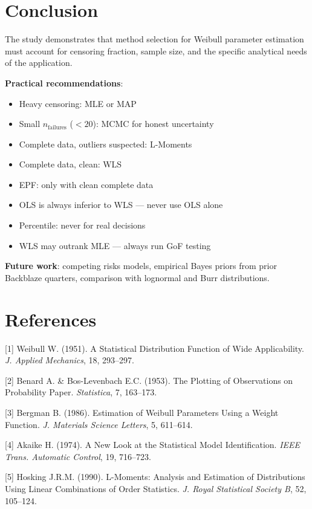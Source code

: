 \documentclass[
]{article}
\providecommand{\tightlist}{%
  \setlength{\itemsep}{0pt}\setlength{\parskip}{0pt}}
\begin{document}
\section{Conclusion}\label{conclusion}

The study demonstrates that method selection for Weibull parameter
estimation must account for censoring fraction, sample size, and the
specific analytical needs of the application.

\textbf{Practical recommendations}:

\begin{itemize}
\tightlist
\item
  Heavy censoring: MLE or MAP
\item
  Small \(n_{\text{failures}}\) (\(<20\)): MCMC for honest uncertainty
\item
  Complete data, outliers suspected: L-Moments
\item
  Complete data, clean: WLS
\item
  EPF: only with clean complete data
\item
  OLS is always inferior to WLS --- never use OLS alone
\item
  Percentile: never for real decisions
\item
  WLS may outrank MLE --- always run GoF testing
\end{itemize}

\textbf{Future work}: competing risks models, empirical Bayes priors
from prior Backblaze quarters, comparison with lognormal and Burr
distributions.

\section{References}\label{references}

{[}1{]} Weibull W. (1951). A Statistical Distribution Function of Wide
Applicability. \emph{J. Applied Mechanics}, 18, 293--297.

{[}2{]} Benard A. \& Bos-Levenbach E.C. (1953). The Plotting of
Observations on Probability Paper. \emph{Statistica}, 7, 163--173.

{[}3{]} Bergman B. (1986). Estimation of Weibull Parameters Using a
Weight Function. \emph{J. Materials Science Letters}, 5, 611--614.

{[}4{]} Akaike H. (1974). A New Look at the Statistical Model
Identification. \emph{IEEE Trans. Automatic Control}, 19, 716--723.

{[}5{]} Hosking J.R.M. (1990). L-Moments: Analysis and Estimation of
Distributions Using Linear Combinations of Order Statistics. \emph{J.
Royal Statistical Society B}, 52, 105--124.
\end{document}
